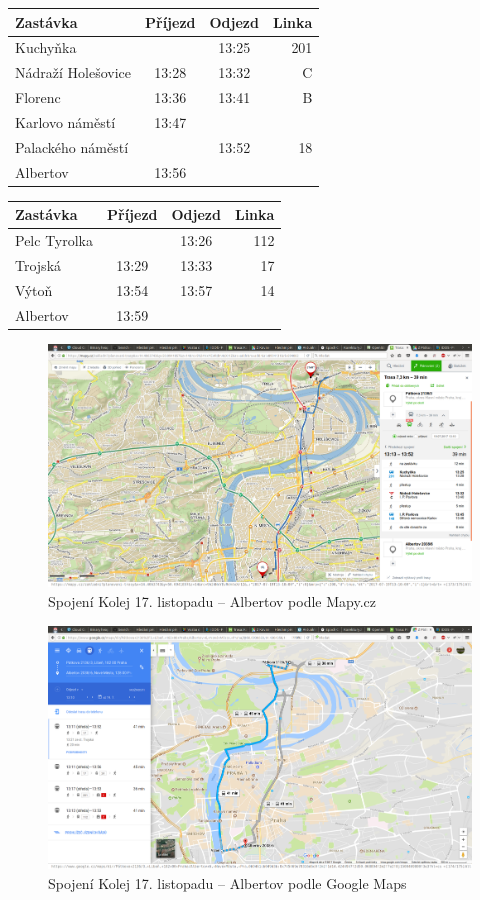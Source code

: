 \begin{tabular}{|l|c|c|r|}\hline
{\bf Zastávka}&{\bf Příjezd}&{\bf Odjezd}&{\bf Linka}\\\hline
Kuchyňka&&13:25&201\\\hline
Nádraží Holešovice&13:28&13:32&C\\\hline
Florenc&13:36&13:41&B\\\hline
Karlovo náměstí&13:47&&\\\hline
Palackého náměstí&&13:52&18\\\hline
Albertov&13:56&&\\\hline
\end{tabular} 

\begin{tabular}{|l|c|c|r|}\hline
{\bf Zastávka}&{\bf Příjezd}&{\bf Odjezd}&{\bf Linka}\\\hline
Pelc Tyrolka&&13:26&112\\\hline
Trojská&13:29&13:33&17\\\hline
Výtoň&13:54&13:57&14\\\hline
Albertov&13:59&&\\\hline
\end{tabular} 

\begin{figure}[h]
  \centering
    \includegraphics[width=\textwidth]{../img/kolej-albertov-seznam.png}
  \caption{Spojení Kolej 17. listopadu -- Albertov podle Mapy.cz}
  \label{fig:kolej-albertov-seznam}
\end{figure}
\begin{figure}[h]
  \centering
    \includegraphics[width=\textwidth]{../img/kolej-albertov-google.png}
  \caption{Spojení Kolej 17. listopadu -- Albertov podle Google Maps}
  \label{fig:kolej-albertov-google}
\end{figure}

